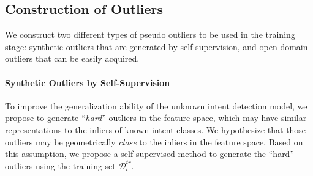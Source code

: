 \subsection{Construction of Outliers}\label{subsec: building outlier}


We construct two different types of pseudo outliers to be used in the training stage: synthetic outliers that are generated by self-supervision, and open-domain outliers that can be easily acquired. 




\paragraph{Synthetic Outliers by Self-Supervision} To improve the generalization ability of the unknown intent detection model, we propose to generate ``\emph{hard}'' outliers in the feature space, which may have similar representations to the inliers of known intent classes. We hypothesize that those outliers may be geometrically \emph{close} to the inliers in the feature space. Based on this assumption, we propose a self-supervised method to generate the ``hard'' outliers using the training set $\mathcal{D}^{tr}_{l}$.  

